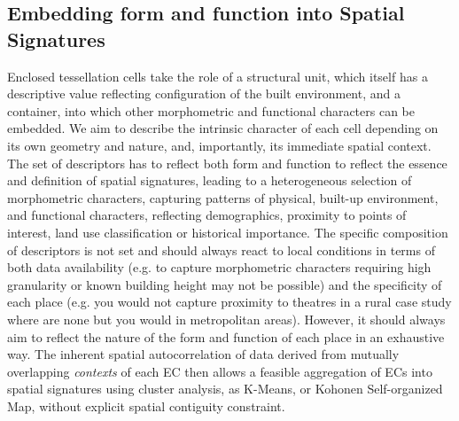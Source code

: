 \subsection{Embedding form and function into Spatial Signatures}
\label{ssec:ss_ff}

Enclosed tessellation cells take the role of a structural unit, which itself has a
descriptive value reflecting configuration of the built environment, and a
container, into which other morphometric and functional characters can be
embedded.
We aim to describe the intrinsic character of each cell depending on its own
geometry and nature, and, importantly, its immediate spatial context.
The set of descriptors has to reflect both form and function to reflect the
essence and definition of spatial signatures, leading to a heterogeneous
selection of morphometric characters, capturing patterns of physical, built-up
environment, and functional characters, reflecting demographics, proximity to
points of interest, land use classification or historical importance.
The specific composition of descriptors is not set and should always react to
local conditions in terms of both data availability (e.g. to capture morphometric characters
requiring high granularity or known building height may not be possible) and
the specificity of each place (e.g. you would not capture proximity to theatres in
a rural case study where are none but you would in metropolitan areas). However,
it should always aim to reflect the nature of the form and function of each
place in an exhaustive way.
The inherent spatial autocorrelation of data derived from mutually overlapping
\textit{contexts} of each EC then allows a feasible aggregation of ECs into
spatial signatures using cluster analysis, as K-Means, or Kohonen Self-organized
Map, without explicit spatial contiguity constraint.
